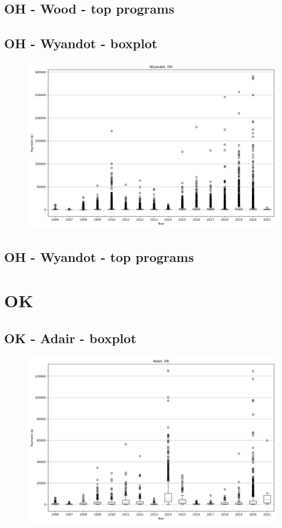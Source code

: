 \subsection*{OH - Wood - top programs}

\newpage
\subsection*{OH - Wyandot - boxplot}
\begin{figure}[h]
\centering
\includegraphics[width=7in]{../output/boxplots/counties/Wyandot-OH_boxplot.png}
\end{figure}


\subsection*{OH - Wyandot - top programs}

\newpage
\section*{OK}
\subsection*{OK - Adair - boxplot}
\begin{figure}[h]
\centering
\includegraphics[width=7in]{../output/boxplots/counties/Adair-OK_boxplot.png}
\end{figure}


